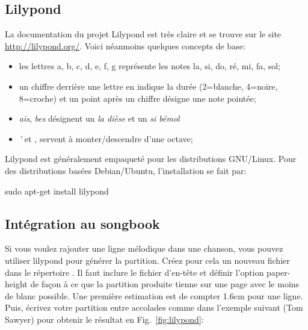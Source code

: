 \documentclass[versionenligne]{patacrep}
\begin{document}
\subsection{Lilypond}

La documentation du projet Lilypond est très
claire et se trouve sur le site \url{http://lilypond.org/}.
Voici néanmoins quelques concepts de base:

\begin{itemize}
\item les lettres a, b, c, d, e, f, g représente les notes la, si, do,
  ré, mi, fa, sol;
\item un chiffre derrière une lettre en indique la durée (2=blanche, 4=noire,
  8=croche) et un point après un chiffre désigne une note pointée;
\item \emph{ais}, \emph{bes} désignent un \emph{la dièse} et un \emph{si bémol}
\item \emph{'} et \emph{,} servent à monter/descendre d'une octave;
\end{itemize}

Lilypond est généralement empaqueté pour les distributions
GNU/Linux. Pour des distributions basées Debian/Ubuntu, l'installation
se fait par:

\begin{unixcom}
  sudo apt-get install lilypond
\end{unixcom}


\subsection{Intégration au songbook}

Si vous voulez rajouter une ligne mélodique dans une chanson, vous
pouvez utiliser lilypond pour générer la partition. Créez pour cela un
nouveau fichier  dans le répertoire
.  Il faut inclure le fichier d'en-tête
 et définir l'option paper-height de façon à ce que la
partition produite tienne sur une page avec le moins de blanc
possible. Une première estimation est de compter 1.6cm pour une
ligne. Puis, écrivez votre partition entre accolades comme dans
l'exemple suivant (Tom Sawyer) pour obtenir le résultat en
Fig.~\ref{fig:lilypond}:
\end{document}
